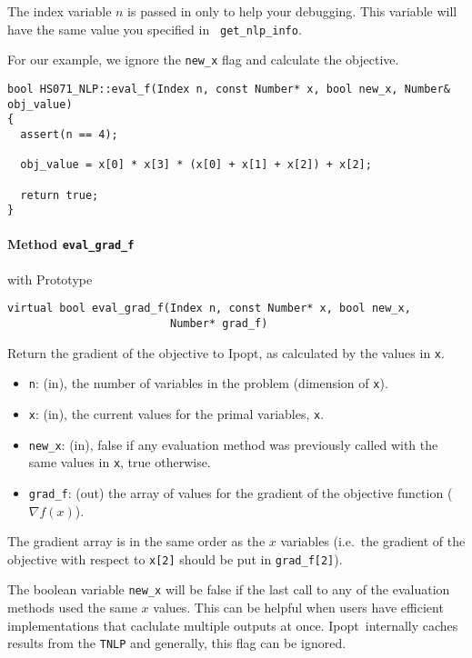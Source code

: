 \documentclass[letter,10pt]{article}
\newcommand{\Ipopt}{{\sc Ipopt}}
\begin{document}
The index variable $n$ is passed in only to help your debugging. This
variable will have the same value you specified in {\tt
get\_nlp\_info}.

For our example, we ignore the {\tt new\_x} flag and calculate the objective.

\begin{footnotesize}
\begin{verbatim}
bool HS071_NLP::eval_f(Index n, const Number* x, bool new_x, Number& obj_value)
{
  assert(n == 4);

  obj_value = x[0] * x[3] * (x[0] + x[1] + x[2]) + x[2];

  return true;
}
\end{verbatim}
\end{footnotesize}

\paragraph{Method {\texttt{eval\_grad\_f}}} with Prototype
\begin{verbatim}
virtual bool eval_grad_f(Index n, const Number* x, bool new_x, 
                         Number* grad_f)
\end{verbatim}
Return the gradient of the objective to \Ipopt, as calculated by the values in {\tt x}.
\begin{itemize}
\item {\tt n}: (in), the number of variables in the problem (dimension of {\tt x}). 
\item {\tt x}: (in), the current values for the primal variables, {\tt x}.
\item {\tt new\_x}: (in), false if any evaluation method was previously called 
        with the same values in {\tt x}, true otherwise.
\item {\tt grad\_f}: (out) the array of values for the gradient of the 
        objective function ($\nabla f(x)$).
\end{itemize}

The gradient array is in the same order as the $x$ variables (i.e.\ the
gradient of the objective with respect to {\tt x[2]} should be put in
{\tt grad\_f[2]}).

The boolean variable {\tt new\_x} will be false if the last call to
any of the evaluation methods used the same $x$ values. This can be
helpful when users have efficient implementations that caclulate
multiple outputs at once. \Ipopt\ internally caches results from the
{\tt TNLP} and generally, this flag can be ignored.
\end{document}
